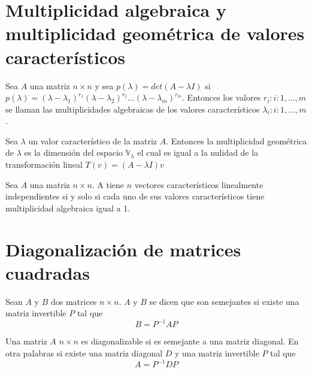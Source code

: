 \section{Multiplicidad algebraica y multiplicidad geométrica de valores característicos}
\begin{dfn}
Sea $A$ una matriz $n \times n$ y sea $p(\lambda) = det (A - \lambda I)$ si $p(\lambda) = (\lambda - \lambda_1)^{r_1} (\lambda - \lambda_2)^{r_2} \ldots (\lambda- \lambda_m)^{r_m}$. Entonces los valores $r_i : i : 1, \ldots, m$ se llaman las multiplicidades algebraicas de los valores característicos $\lambda_i : i:1, \ldots, m$.
\end{dfn}

\begin{dfn}
Sea $\lambda$ un valor característico de la matriz $A$. Entonces la multiplicidad geométrica de $\lambda$ es la dimensión del espacio $\mathbb{V}_{\lambda}$ el cual es igual a la nulidad de la transformación lineal $T(v) = (A- \lambda I)v$
\end{dfn}

\begin{theorem}
Sea $A$ una matriz $n \times n$. A tiene $n$ vectores característicos linealmente independientes si y solo si cada uno de sus valores característicos tiene multiplicidad algebraica igual a 1.
\end{theorem}

\section{Diagonalización de matrices cuadradas}
\begin{dfn}
Sean $A$ y $B$ dos matrices $n \times n$. $A$ y $B$ se dicen que son semejantes si existe una matriz invertible $P$ tal que 
$$B= P^{-1} AP$$
\end{dfn}

\begin{dfn}
Una matriz $A$ $n \times n$ es diagonalizable si es semejante a una matriz diagonal. En otra palabras si existe una matriz diagonal $D$ y una matriz invertible $P$ tal que 
$$A=P^{-1}DP$$
\end{dfn}

